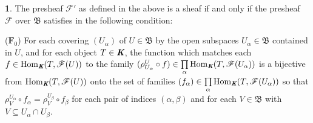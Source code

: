 \documentclass[12pt]{amsart}
\newcommand{\Hom}{\operatorname{Hom}}
\theoremstyle{definition}
\newtheorem{bk}[proposition]{}
\begin{document}
\begin{bk}\label{I: 3.2.2} The presheaf $\mathscr{F}'$ as defined in the above is a sheaf if and only if the presheaf $\mathscr{F}$ over $\mathfrak{B}$ satisfies in the following condition:


($\textbf{F}_{0}$) For each covering $(U_{\alpha})$ of $U\in\mathfrak{B}$ by the open subspaces $U_{\alpha}\in\mathfrak{B}$ contained in $U$, and for each object $T\in\emph{\textbf{K}}$, the function which matches each $f\in\Hom_{\emph{\textbf{K}}}(T, \mathscr{F}(U))$ to the family $(\rho_{U_{\alpha}}^{U}\circ f)\in\prod\limits_{\alpha}\Hom_{\emph{\textbf{K}}}(T, \mathscr{F}(U_{\alpha}))$ is a bijective from $\Hom_{\emph{\textbf{K}}}(T, \mathscr{F}(U))$ onto the set of families $(f_{\alpha})\in\prod\limits_{\alpha}\Hom_{\emph{\textbf{K}}}(T, \mathscr{F}(U_{\alpha}))$ so that $\rho_{V}^{U_{\alpha}}\circ f_{\alpha}=\rho_{V}^{U_{\beta}}\circ f_{\beta}$ for each pair of indices $(\alpha, \beta)$ and for each $V\in\mathfrak{B}$ with $V\subseteq U_{\alpha}\cap U_{\beta}$.



\end{bk}
\end{document}
